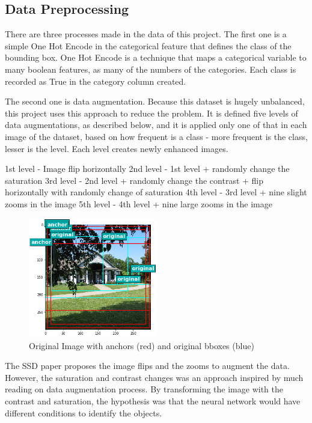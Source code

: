 \documentclass[11pt, a4paper, twocolumn]{article}
\begin{document}
\subsection{Data Preprocessing}

There are three processes made in the data of this project. The first one is a simple One Hot Encode in the categorical feature that defines the class of the bounding box. One Hot Encode is a technique that maps a categorical variable to many boolean features, as many of the numbers of the categories. Each class is recorded as True in the category column created.

The second one is data augmentation. Because this dataset is hugely unbalanced, this project uses this approach to reduce the problem. It is defined five levels of data augmentations, as described below, and it is applied only one of that in each image of the dataset, based on how frequent is a class - more frequent is the class, lesser is the level. Each level creates newly enhanced images.

1st level - Image flip horizontally
2nd level - 1st level + randomly change the saturation 
3rd level - 2nd level + randomly change the contrast + flip horizontally with randomly change of saturation 
4th level - 3rd level + nine slight zooms in the image
5th level - 4th level + nine large zooms in the image

\begin{figure}[!ht]
	\centering
	\includegraphics[width=0.5\textwidth]{original-img.png}
	\caption{\scriptsize Original Image with anchors (red) and original bboxes (blue)}
	\label{original}
\end{figure}

The SSD paper proposes the image flips and the zooms to augment the data. However, the saturation and contrast changes was an approach inspired by much reading on data augmentation process. By transforming the image with the contrast and saturation, the hypothesis was that the neural network would have different conditions to identify the objects. 
\end{document}
